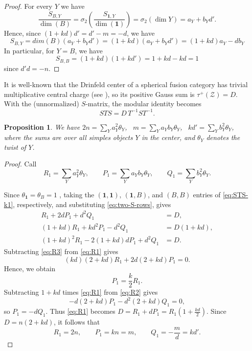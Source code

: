 \documentclass[a4paper,twoside,11pt]{amsart}
\newtheorem{proposition}[theorem]{Proposition}
\theoremstyle{plain} %
\theoremstyle{definition}
\begin{document}
\begin{proof}



For every $Y$ we have
\[
\frac{S_{B,Y}}{\dim(B)}
=\sigma_2\!\left(\frac{S_{\mathbf 1,Y}}{\dim(\mathbf 1)}\right)
=\sigma_2(\dim Y)=a_Y+b_Yd'.
\]
Hence, since $(1+kd)d'=d'-m=-d$, we have
\begin{equation}
    S_{B,Y}=dim(B)(a_Y+b_Yd')=(1+kd)(a_Y+b_Yd')=(1+kd)a_Y-db_Y
\end{equation}
 In particular, for $Y=B$, we have 
\begin{equation}
    S_{B,B}=(1+kd)(1+kd')=1+kd-kd=1
\end{equation}
since $d'd=-n$.
\end{proof}

\medskip


It is well-known that the Drinfeld center of a spherical fusion category has trivial multiplicative central charge (see \cite[Section 8.27]{EGNO}), so its positive Gauss sum is $\tau^+(\mathcal Z)=D$.
With the (unnormalized) $S$-matrix, the modular identity becomes
\begin{equation}\label{eq:STS-k1}
STS=D\,T^{-1}ST^{-1}.
\end{equation}



\begin{proposition}
We have $2n=\sum_Ya_Y^2\theta_Y$,~ $m=\sum_Ya_Yb_Y\theta_Y$,~ $kd'=\sum_Yb_Y^2\theta_Y$, where the sums are over all simples objects $Y$ in the center, and $\theta_Y$ denotes the twist of $Y$.
\end{proposition}
\begin{proof}
    Call \[
R_1=\sum_Ya_Y^2\theta_Y,\qquad
P_1=\sum_Ya_Yb_Y\theta_Y,\qquad
Q_1=\sum_Yb_Y^2\theta_Y.
\]




Since $\theta_{\mathbf 1}=\theta_B=1$ \cite[Remark 4.6]{NS}, taking the
$(\mathbf 1,\mathbf 1)$, $(\mathbf 1,B)$, and $(B,B)$ entries
of \eqref{eq:STS-k1}, respectively, and substituting
\eqref{eq:two-S-rows}, gives
\begin{align}
R_1+2dP_1+d^2Q_1&=D,\label{eq:R1}\\
(1+kd)R_1+kd^2P_1-d^2Q_1&=D(1+kd),\label{eq:R2}\\
(1+kd)^2R_1-2(1+kd)dP_1+d^2Q_1&=D.\label{eq:R3}
\end{align}
Subtracting \eqref{eq:R3} from \eqref{eq:R1} gives
\[
(kd)(2+kd)R_1+2d(2+kd)P_1=0.
\]
Hence, we obtain
\[
P_1=\frac{k}{2}R_1.
\]
Subtracting $1+kd$ times \eqref{eq:R1} from \eqref{eq:R2} gives
\[
-d(2+kd)P_1-d^2(2+kd)Q_1=0,
\]
so $P_1=-dQ_1$. Thus \eqref{eq:R1} becomes
$D=R_1+dP_1=R_1 (1+\frac{kd}{2})$. Since $D=n(2+kd)$, it follows that
\begin{equation}\label{eq:three-twist-sums}
R_1=2n,\qquad P_1=kn=m,\qquad
Q_1=-\frac{m}{d}=kd'.
\end{equation}
\end{proof}
\medskip
\end{document}
